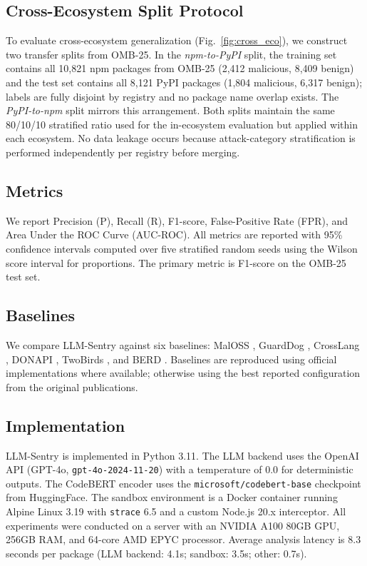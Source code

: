\documentclass[conference]{IEEEtran}
\begin{document}
\subsection{Cross-Ecosystem Split Protocol}

To evaluate cross-ecosystem generalization (Fig.~\ref{fig:cross_eco}), we construct two transfer splits from OMB-25. In the \textit{npm-to-PyPI} split, the training set contains all 10,821 npm packages from OMB-25 (2,412 malicious, 8,409 benign) and the test set contains all 8,121 PyPI packages (1,804 malicious, 6,317 benign); labels are fully disjoint by registry and no package name overlap exists. The \textit{PyPI-to-npm} split mirrors this arrangement. Both splits maintain the same 80/10/10 stratified ratio used for the in-ecosystem evaluation but applied within each ecosystem. No data leakage occurs because attack-category stratification is performed independently per registry before merging.

\subsection{Metrics}

We report Precision (P), Recall (R), F1-score, False-Positive Rate (FPR), and Area Under the ROC Curve (AUC-ROC). All metrics are reported with 95\% confidence intervals computed over five stratified random seeds using the Wilson score interval for proportions. The primary metric is F1-score on the OMB-25 test set.

\subsection{Baselines}

We compare LLM-Sentry against six baselines: MalOSS \cite{sejfia2022practical}, GuardDog \cite{guarddog2023msr}, CrossLang \cite{crosslang2023acsac}, DONAPI \cite{donapi2024usenix}, TwoBirds \cite{twobirdstone2024tosem}, and BERD \cite{berd2026www}. Baselines are reproduced using official implementations where available; otherwise using the best reported configuration from the original publications.

\subsection{Implementation}

LLM-Sentry is implemented in Python 3.11. The LLM backend uses the OpenAI API (GPT-4o, \texttt{gpt-4o-2024-11-20}) with a temperature of 0.0 for deterministic outputs. The CodeBERT encoder uses the \texttt{microsoft/codebert-base} checkpoint from HuggingFace. The sandbox environment is a Docker container running Alpine Linux 3.19 with \texttt{strace} 6.5 and a custom Node.js 20.x interceptor. All experiments were conducted on a server with an NVIDIA A100 80GB GPU, 256GB RAM, and 64-core AMD EPYC processor. Average analysis latency is 8.3 seconds per package (LLM backend: 4.1s; sandbox: 3.5s; other: 0.7s).
\end{document}
